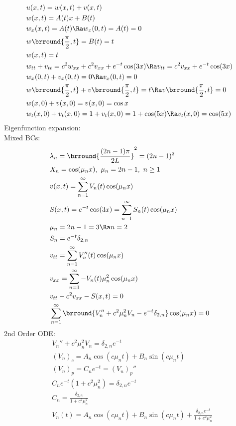 \begin{align*}
    &u(x,t)=w(x,t)+v(x,t)\\
    &w(x,t)=A(t)x+B(t)\\
    &w_x(x,t)=A(t)\Ra w_x(0,t)=A(t)=0\\
    &w\brround{\frac{\pi}{2},t}=B(t)=t\\
    &w(x,t)=t\\
    &w_{tt}+v_{tt}=c^2w_{xx}+c^2v_{xx}+e^{-t}\cos(3x)\Ra v_{tt}=c^2v_{xx}+e^{-t}\cos(3x)\\
    &w_x(0,t)+v_x(0,t)=0\Ra v_x(0,t)=0\\
    &w\brround{\frac{\pi}{2},t}+v\brround{\frac{\pi}{2},t}=t\Ra v\brround{\frac{\pi}{2},t}=0\\
    &w(x,0)+v(x,0)=v(x,0)=\cos x\\
    &w_t(x,0)+v_t(x,0)=1+v_t(x,0)=1+\cos(5x)\Ra v_t(x,0)=\cos(5x)
\end{align*}
Eigenfunction expansion:\\
Mixed BCs:
\begin{align*}
    &\lambda_n=\brround{\frac{(2n-1)\pi}{2L}}^2=(2n-1)^2\\
    &X_n=\cos(\mu_nx),\ \mu_n=2n-1,\ n\geq1\\
    &v(x,t)=\sum_{n=1}^\infty V_n(t)\cos(\mu_nx)\\
    &S(x,t)=e^{-t}\cos(3x)=\sum_{n=1}^\infty S_n(t)\cos(\mu_n x)\\
    &\mu_n=2n-1=3\Ra n=2\\
    &S_n=e^{-t}\delta_{2,n}\\
    &v_{tt}=\sum_{n=1}^\infty V_n''(t)\cos(\mu_nx)\\
    &v_{xx}=\sum_{n=1}^\infty-V_n(t)\mu_n^2\cos(\mu_nx)\\
    &v_{tt}-c^2v_{xx}-S(x,t)=0\\
    &\sum_{n=1}^\infty\brround{V_n''+c^2\mu_n^2V_n-e^{-t}\delta_{2,n}}\cos(\mu_nx)=0
\end{align*}
2nd Order ODE:
\begin{align*}
    &V_n''+c^2\mu_n^2V_n=\delta_{2,n}e^{-t}\\
    &(V_n)_c=A_n\cos(c\mu_nt)+B_n\sin(c\mu_nt)\\
    &(V_n)_p=C_ne^{-t}= (V_n)_p''\\
    &C_ne^{-t}(1+c^2\mu_n^2)=\delta_{2,n}e^{-t}\\
    &C_n=\frac{\delta_{2,n}}{1+c^2\mu_n^2}\\
    &V_n(t)=A_n\cos(c\mu_nt)+B_n\sin(c\mu_nt)+\frac{\delta_{2,n}e^{-t}}{1+c^2\mu_n^2}
\end{align*}

